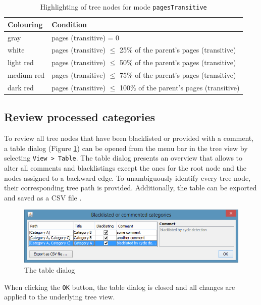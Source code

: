 \documentclass{scrartcl}
\begin{document}
\begin{table}[ht]
\scriptsize
\centering
\begin{tabular}{ll}
\toprule 
\textbf{Colouring} & \textbf{Condition} \\
\midrule
gray & pages (transitive) = 0 \\ 
\midrule
white & pages (transitive) $\le$ 25\% of the parent's pages (transitive)\\ 
\midrule
light red & pages (transitive) $\le$ 50\% of the parent's pages (transitive)\\ 
\midrule
medium red & pages (transitive) $\le$ 75\% of the parent's pages (transitive)\\ 
\midrule
dark red & pages (transitive) $\le$ 100\% of the parent's pages (transitive)\\
\bottomrule
\end{tabular} 
\caption{Highlighting of tree nodes for mode \texttt{pagesTransitive}}
\label{tab:highlighting_pages_transitive}
\end{table}

\subsection{Review processed categories}
\label{sec:review}

To review all tree nodes that have been blacklisted or provided with a comment, a table dialog (Figure \ref{fig:table_dialog}) can be opened from the menu bar in the tree view by selecting \texttt{View > Table}. The table dialog presents an overview that allows to alter all comments and blacklistings except the ones for the root node and the nodes assigned to a backward edge. To unambiguously identify every tree node, their corresponding tree path is provided. Additionally, the table can be exported and saved as a CSV file \cite{RFC4180}.

\begin{figure}[ht]
\centering
\includegraphics[scale=0.8]{figures/table_dialog.png}
\caption{The table dialog}
\label{fig:table_dialog}
\end{figure}

When clicking the \texttt{OK} button, the table dialog is closed and all changes are applied to the underlying tree view.
\end{document}
